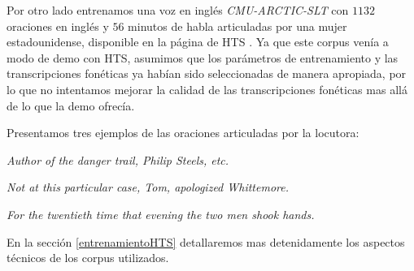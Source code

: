 Por otro lado entrenamos una voz en inglés \textit{CMU-ARCTIC-SLT}\cite{cmuArtic} con $1132$ oraciones en inglés y $56$ minutos de habla articuladas por una mujer estadounidense, disponible en la página de HTS \cite{hts}. Ya que este corpus venía a modo de demo con HTS, asumimos que los parámetros de entrenamiento y las transcripciones fonéticas ya habían sido seleccionadas de manera apropiada, por lo que no intentamos mejorar la calidad de las transcripciones fonéticas mas allá de lo que la demo ofrecía.

Presentamos tres ejemplos de las oraciones articuladas por la locutora:

\indent\indent \textit{Author of the danger trail, Philip Steels, etc.}

\indent\indent \textit{Not at this particular case, Tom, apologized Whittemore.}

\indent\indent \textit{For the twentieth time that evening the two men shook hands.}

En la sección \ref{entrenamientoHTS} detallaremos mas detenidamente los aspectos técnicos de los corpus utilizados.


